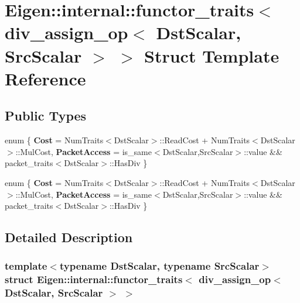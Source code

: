 \hypertarget{struct_eigen_1_1internal_1_1functor__traits_3_01div__assign__op_3_01_dst_scalar_00_01_src_scalar_01_4_01_4}{}\section{Eigen\+:\+:internal\+:\+:functor\+\_\+traits$<$ div\+\_\+assign\+\_\+op$<$ Dst\+Scalar, Src\+Scalar $>$ $>$ Struct Template Reference}
\label{struct_eigen_1_1internal_1_1functor__traits_3_01div__assign__op_3_01_dst_scalar_00_01_src_scalar_01_4_01_4}
\subsection*{Public Types}
\begin{DoxyCompactItemize}
\item 
\mbox{\label{struct_eigen_1_1internal_1_1functor__traits_3_01div__assign__op_3_01_dst_scalar_00_01_src_scalar_01_4_01_4_a40182a0d70c101b71c83143f2f27116a}} 
enum \{ {\bfseries Cost} = Num\+Traits$<$Dst\+Scalar$>$\+:\+:Read\+Cost + Num\+Traits$<$Dst\+Scalar$>$\+:\+:Mul\+Cost, 
{\bfseries Packet\+Access} = is\+\_\+same$<$Dst\+Scalar,Src\+Scalar$>$\+:\+:value \&\& packet\+\_\+traits$<$Dst\+Scalar$>$\+:\+:Has\+Div
 \}
\item 
\mbox{\label{struct_eigen_1_1internal_1_1functor__traits_3_01div__assign__op_3_01_dst_scalar_00_01_src_scalar_01_4_01_4_a641c819ac177cb6c978d43752bc2d197}} 
enum \{ {\bfseries Cost} = Num\+Traits$<$Dst\+Scalar$>$\+:\+:Read\+Cost + Num\+Traits$<$Dst\+Scalar$>$\+:\+:Mul\+Cost, 
{\bfseries Packet\+Access} = is\+\_\+same$<$Dst\+Scalar,Src\+Scalar$>$\+:\+:value \&\& packet\+\_\+traits$<$Dst\+Scalar$>$\+:\+:Has\+Div
 \}
\end{DoxyCompactItemize}


\subsection{Detailed Description}
\subsubsection*{template$<$typename Dst\+Scalar, typename Src\+Scalar$>$\newline
struct Eigen\+::internal\+::functor\+\_\+traits$<$ div\+\_\+assign\+\_\+op$<$ Dst\+Scalar, Src\+Scalar $>$ $>$}




